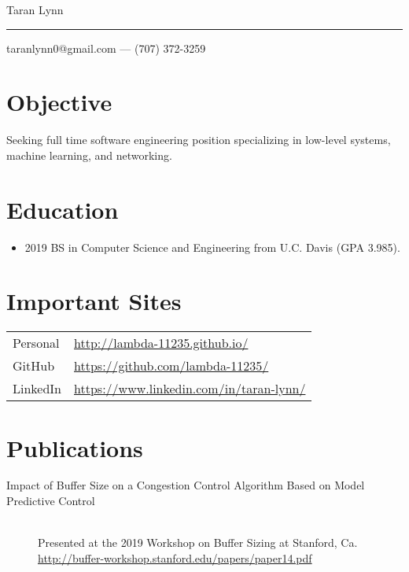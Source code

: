 \documentclass{article}
\begin{document}
\begin{center}
    {\Huge Taran Lynn}\\
    \vspace{0.25em}
    \hrule
    \vspace{0.25em}
    taranlynn0@gmail.com --- (707) 372-3259
\end{center}

\section*{Objective}

Seeking full time software engineering position specializing in low-level
systems, machine learning, and networking.

\section*{Education}

\begin{itemize}
    \item 2019 BS in Computer Science and Engineering from U.C. Davis
        (GPA 3.985).
\end{itemize}

\section*{Important Sites}

\begin{tabular}{ll}
    Personal & \url{http://lambda-11235.github.io/}\\
    GitHub & \url{https://github.com/lambda-11235/}\\
    LinkedIn & \url{https://www.linkedin.com/in/taran-lynn/}\\
\end{tabular}


\section*{Publications}

\begin{description}
    \item[Impact of Buffer Size on a Congestion Control Algorithm Based on Model Predictive Control]
        \hfill\\
        Presented at the 2019 Workshop on Buffer Sizing at Stanford, Ca.\\
        \url{http://buffer-workshop.stanford.edu/papers/paper14.pdf}
\end{description}
\end{document}
